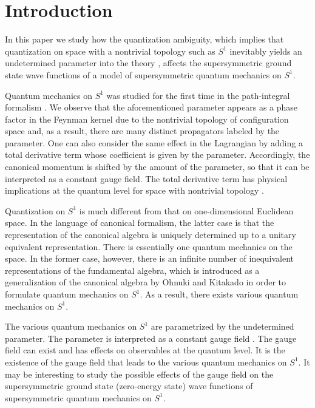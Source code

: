 \documentclass[a4paper,12pt]{article}
\begin{document}
\section{Introduction}
In this paper we study how the quantization ambiguity, which implies 
that quantization on space with a nontrivial topology such 
as $S^1$ inevitably yields an undetermined parameter 
into the theory \cite{tsutsui}, affects the supersymmetric ground state wave 
functions 
of a model of supersymmetric quantum mechanics on $S^1$. 
\par
Quantum mechanics on $S^1$ was studied for the first time in the path-integral 
formalism \cite{schul1}\cite{laid}. We observe that the aforementioned 
parameter appears as a phase factor in the Feynman kernel due to the 
nontrivial topology of configuration space and, as a result, there 
are many distinct propagators labeled by the parameter. 
One can also consider the same effect in 
the Lagrangian by adding a total derivative term whose coefficient is given 
by the parameter. Accordingly, the canonical momentum is shifted by the 
amount of the parameter, so that it can be interpreted as a constant 
gauge field. The total derivative term has physical implications 
at the quantum level for space with nontrivial topology \cite{schul2}.
\par
Quantization on $S^1$ is much different from that on one-dimensional
Euclidean space. In the language of canonical formalism, the latter 
case is that the representation of the canonical algebra is uniquely 
determined up to a unitary equivalent representation. There is essentially one 
quantum mechanics on the space. In the former case, however, there is
an infinite number of inequivalent representations of the 
fundamental algebra, which is introduced as a generalization of the canonical
algebra by Ohnuki and Kitakado \cite{ok} in order to formulate 
quantum mechanics on $S^1$.
As a result, there exists various quantum mechanics on $S^1$.  
\par
The various quantum mechanics on $S^1$ are parametrized 
by the undetermined parameter. The parameter is interpreted as a 
constant gauge field \cite{ok}\cite{tanimura}. 
The gauge field can exist and has effects on observables at the 
quantum level. It is the existence of the gauge field that leads to the  
various quantum mechanics on $S^1$. 
It may be interesting to study the possible 
effects of the gauge field on the supersymmetric 
ground state (zero-energy state) wave 
functions of supersymmetric quantum mechanics on $S^1$. 
\end{document}
